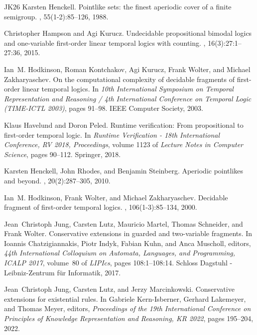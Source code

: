 \documentclass[10pt,a4paper]{amsart}
\theoremstyle{plain}
\theoremstyle{definition}
\begin{document}
\begin{thebibliography}{{}JK{\etalchar{+}}26}
Karsten Henckell.
\newblock Pointlike sets: the finest aperiodic cover of a finite semigroup.
, 55(1-2):85--126, 1988.

Christopher Hampson and Agi Kurucz.
\newblock Undecidable propositional bimodal logics and one-variable first-order linear temporal logics with counting.
, 16(3):27:1--27:36, 2015.

Ian~M. Hodkinson, Roman Kontchakov, Agi Kurucz, Frank Wolter, and Michael Zakharyaschev.
\newblock On the computational complexity of decidable fragments of first-order linear temporal logics.
\newblock In {\em 10th International Symposium on Temporal Representation and Reasoning / 4th International Conference on Temporal Logic {(TIME-ICTL} 2003)}, pages 91--98. {IEEE} Computer Society, 2003.

Klaus Havelund and Doron Peled.
\newblock Runtime verification: From propositional to first-order temporal logic.
\newblock In {\em Runtime Verification - 18th International Conference, {RV} 2018, Proceedings}, volume 1123 of {\em Lecture Notes in Computer Science}, pages 90--112. Springer, 2018.

Karsten Henckell, John Rhodes, and Benjamin Steinberg.
\newblock Aperiodic pointlikes and beyond.
, 20(2):287--305, 2010.

Ian~M. Hodkinson, Frank Wolter, and Michael Zakharyaschev.
\newblock Decidable fragment of first-order temporal logics.
, 106(1-3):85--134, 2000.

Jean~Christoph Jung, Carsten Lutz, Mauricio Martel, Thomas Schneider, and Frank Wolter.
\newblock Conservative extensions in guarded and two-variable fragments.
\newblock In Ioannis Chatzigiannakis, Piotr Indyk, Fabian Kuhn, and Anca Muscholl, editors, {\em 44th International Colloquium on Automata, Languages, and Programming, {ICALP} 2017}, volume~80 of {\em LIPIcs}, pages 108:1--108:14. Schloss Dagstuhl - Leibniz-Zentrum f{\"{u}}r Informatik, 2017.

Jean~Christoph Jung, Carsten Lutz, and Jerzy Marcinkowski.
\newblock Conservative extensions for existential rules.
\newblock In Gabriele Kern{-}Isberner, Gerhard Lakemeyer, and Thomas Meyer, editors, {\em Proceedings of the 19th International Conference on Principles of Knowledge Representation and Reasoning, {KR} 2022}, pages 195--204, 2022.


\end{thebibliography}
\end{document}
